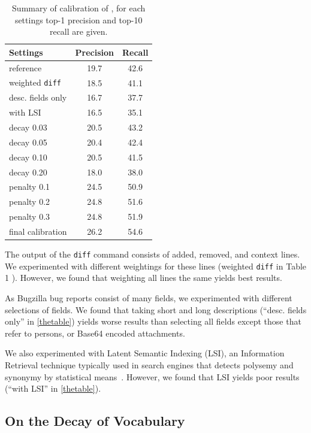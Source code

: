 \begin{table}
\center
{\footnotesize \begin{tabular}{l | c  c}
  Settings & Precision & Recall \\ \hline
  reference & 19.7 & 42.6 \\ 
  weighted \verb$diff$ & 18.5 & 41.1 \\
  desc. fields only & 16.7 & 37.7 \\
  with LSI & 16.5 & 35.1 \\
  decay 0.03 & 20.5 & 43.2 \\ 
  decay 0.05 & 20.4 & 42.4 \\ 
  decay 0.10 & 20.5 & 41.5 \\ 
  decay 0.20 & 18.0 & 38.0 \\ 
  penalty 0.1 & 24.5 & 50.9 \\ 
  penalty 0.2 & 24.8 & 51.6 \\ 
  penalty 0.3 & 24.8 & 51.9 \\
  final calibration & 26.2 & 54.6 \\
\end{tabular}
}\vspace{0.1in}
\caption{Summary of calibration of \trainingset, for each settings top-1 precision and top-10 recall are given.}
\label{thetable}
\end{table}

The output of the \verb$diff$ command consists of added, removed, and context lines. We experimented with different weightings for these lines (weighted \verb$diff$ in Table 1%
). However, we found that weighting all lines the same yields best results. 

As Bugzilla bug reports consist of many fields, we experimented with different selections of fields. We found that taking short and long descriptions (``desc. fields only'' in \autoref{thetable}) yields worse results than selecting all fields except those that refer to persons, or Base64 encoded attachments. 

We also experimented with Latent Semantic Indexing (LSI), an Information Retrieval technique typically used in search engines that detects polysemy and synonymy by statistical means~\cite{Deer90a}. However, we found that LSI yields poor results (``with LSI'' in \autoref{thetable}).

\subsection{On the Decay of Vocabulary}

